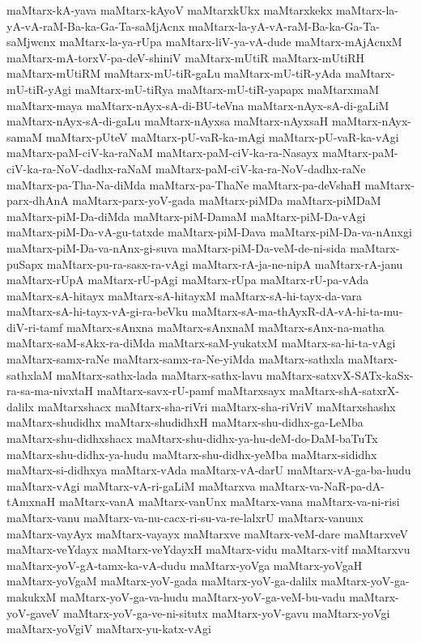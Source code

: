 {maMtarx-kA-yava
maMtarx-kAyoV
maMtarxkUkx
maMtarxkekx
maMtarx-la-yA-vA-raM-Ba-ka-Ga-Ta-saMjAcnx
maMtarx-la-yA-vA-raM-Ba-ka-Ga-Ta-saMjwcnx
maMtarx-la-ya-rUpa
maMtarx-liV-ya-vA-dude
maMtarx-mAjAcnxM
maMtarx-mA-torxV-pa-deV-shiniV
maMtarx-mUtiR
maMtarx-mUtiRH
maMtarx-mUtiRM
maMtarx-mU-tiR-gaLu
maMtarx-mU-tiR-yAda
maMtarx-mU-tiR-yAgi
maMtarx-mU-tiRya
maMtarx-mU-tiR-yapapx
maMtarxmaM
maMtarx-maya
maMtarx-nAyx-sA-di-BU-teVna
maMtarx-nAyx-sA-di-gaLiM
maMtarx-nAyx-sA-di-gaLu
maMtarx-nAyxsa
maMtarx-nAyxsaH
maMtarx-nAyx-samaM
maMtarx-pUteV
maMtarx-pU-vaR-ka-mAgi
maMtarx-pU-vaR-ka-vAgi
maMtarx-paM-ciV-ka-raNaM
maMtarx-paM-ciV-ka-ra-Nasayx
maMtarx-paM-ciV-ka-ra-NoV-dadhx-raNaM
maMtarx-paM-ciV-ka-ra-NoV-dadhx-raNe
maMtarx-pa-Tha-Na-diMda
maMtarx-pa-ThaNe
maMtarx-pa-deVshaH
maMtarx-parx-dhAnA
maMtarx-parx-yoV-gada
maMtarx-piMDa
maMtarx-piMDaM
maMtarx-piM-Da-diMda
maMtarx-piM-DamaM
maMtarx-piM-Da-vAgi
maMtarx-piM-Da-vA-gu-tatxde
maMtarx-piM-Dava
maMtarx-piM-Da-va-nAnxgi
maMtarx-piM-Da-va-nAnx-gi-suva
maMtarx-piM-Da-veM-de-ni-sida
maMtarx-puSapx
maMtarx-pu-ra-sasx-ra-vAgi
maMtarx-rA-ja-ne-nipA
maMtarx-rA-janu
maMtarx-rUpA
maMtarx-rU-pAgi
maMtarx-rUpa
maMtarx-rU-pa-vAda
maMtarx-sA-hitayx
maMtarx-sA-hitayxM
maMtarx-sA-hi-tayx-da-vara
maMtarx-sA-hi-tayx-vA-gi-ra-beVku
maMtarx-sA-ma-thAyxR-dA-vA-hi-ta-mu-diV-ri-tamf
maMtarx-sAnxna
maMtarx-sAnxnaM
maMtarx-sAnx-na-matha
maMtarx-saM-sAkx-ra-diMda
maMtarx-saM-yukatxM
maMtarx-sa-hi-ta-vAgi
maMtarx-samx-raNe
maMtarx-samx-ra-Ne-yiMda
maMtarx-sathxla
maMtarx-sathxlaM
maMtarx-sathx-lada
maMtarx-sathx-lavu
maMtarx-satxvX-SATx-kaSx-ra-sa-ma-nivxtaH
maMtarx-savx-rU-pamf
maMtarxsayx
maMtarx-shA-satxrX-dalilx
maMtarxshacx
maMtarx-sha-riVri
maMtarx-sha-riVriV
maMtarxshashx
maMtarx-shudidhx
maMtarx-shudidhxH
maMtarx-shu-didhx-ga-LeMba
maMtarx-shu-didhxshacx
maMtarx-shu-didhx-ya-hu-deM-do-DaM-baTuTx
maMtarx-shu-didhx-ya-hudu
maMtarx-shu-didhx-yeMba
maMtarx-sididhx
maMtarx-si-didhxya
maMtarx-vAda
maMtarx-vA-darU
maMtarx-vA-ga-ba-hudu
maMtarx-vAgi
maMtarx-vA-ri-gaLiM
maMtarxva
maMtarx-va-NaR-pa-dA-tAmxnaH
maMtarx-vanA
maMtarx-vanUnx
maMtarx-vana
maMtarx-va-ni-risi
maMtarx-vanu
maMtarx-va-nu-cacx-ri-su-va-re-lalxrU
maMtarx-vanunx
maMtarx-vayAyx
maMtarx-vayayx
maMtarxve
maMtarx-veM-dare
maMtarxveV
maMtarx-veYdayx
maMtarx-veYdayxH
maMtarx-vidu
maMtarx-vitf
maMtarxvu
maMtarx-yoV-gA-tamx-ka-vA-dudu
maMtarx-yoVga
maMtarx-yoVgaH
maMtarx-yoVgaM
maMtarx-yoV-gada
maMtarx-yoV-ga-dalilx
maMtarx-yoV-ga-makukxM
maMtarx-yoV-ga-va-hudu
maMtarx-yoV-ga-veM-bu-vadu
maMtarx-yoV-gaveV
maMtarx-yoV-ga-ve-ni-situtx
maMtarx-yoV-gavu
maMtarx-yoVgi
maMtarx-yoVgiV
maMtarx-yu-katx-vAgi
}

